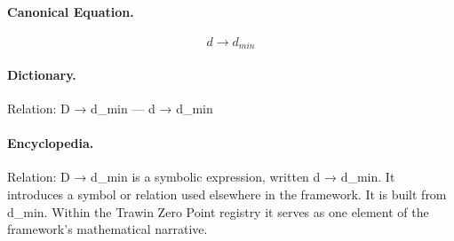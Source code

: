 \paragraph{Canonical Equation.}
\[
d \to d_{min}
\]

\paragraph{Dictionary.}
Relation: D → d\_min — d → d\_min

\paragraph{Encyclopedia.}
Relation: D → d\_min is a symbolic expression, written d → d\_min. It introduces a symbol or relation used elsewhere in the framework. It is built from d\_min. Within the Trawin Zero Point registry it serves as one element of the framework's mathematical narrative.
